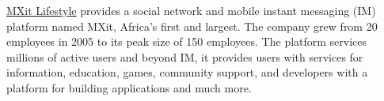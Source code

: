 \documentclass[10pt,a4paper,final]{columncv}
\begin{document}
\noindent \href{http://www.mxit.com/}{MXit Lifestyle} provides a social network and mobile
          instant messaging (IM) platform named MXit, Africa's first and largest. The
          company grew from 20 employees in 2005 to its peak size of 150
          employees. The platform services millions of active users and beyond IM,
          it provides users with services for information, education, games, community 
          support, and developers with a platform for building applications and much more. 
\\[-3em]

\begin{cvenv}
  \cvitem{}{} %
  

\end{cvenv}
\end{document}
